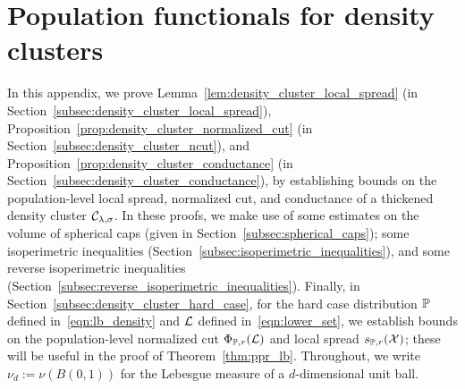\section{Population functionals for density clusters}
\label{apdx:density_cluster_population_functionals}
In this appendix, we prove Lemma~\ref{lem:density_cluster_local_spread} (in Section~\ref{subsec:density_cluster_local_spread}), Proposition~\ref{prop:density_cluster_normalized_cut} (in Section~\ref{subsec:density_cluster_ncut}), and Proposition~\ref{prop:density_cluster_conductance} (in Section~\ref{subsec:density_cluster_conductance}), by establishing bounds on the population-level local spread, normalized cut, and conductance of a thickened density cluster $\mathcal{C}_{\lambda,\sigma}$. In these proofs, we make use of some estimates on the volume of spherical caps (given in Section~\ref{subsec:spherical_caps}); some isoperimetric inequalities (Section~\ref{subsec:isoperimetric_inequalities}), and some reverse isoperimetric inequalities (Section~\ref{subsec:reverse_isoperimetric_inequalities}). Finally, in Section~\ref{subsec:density_cluster_hard_case}, for the hard case distribution $\mathbb{P}$ defined in~\eqref{eqn:lb_density} and $\mathcal{L}$ defined in~\eqref{eqn:lower_set}, we establish bounds on the population-level normalized cut $\Phi_{\mathbb{P},r}(\mathcal{L})$ and local spread $s_{\mathbb{P},r}(\mathcal{X})$; these will be useful in the proof of Theorem~\ref{thm:ppr_lb}. Throughout, we write $\nu_d := \nu(B(0,1))$ for the Lebesgue measure of a $d$-dimensional unit ball.

